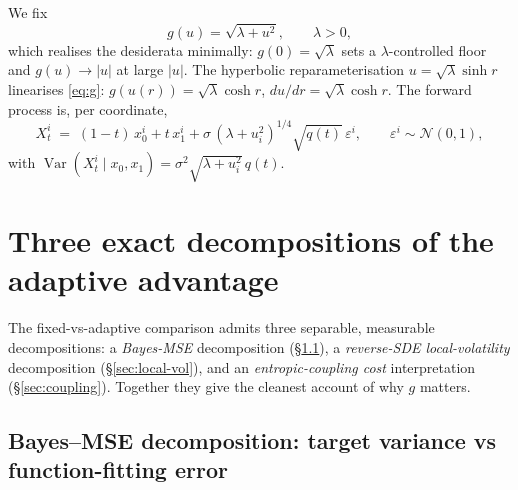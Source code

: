 \documentclass[11pt]{article}
\newcommand{\Var}{\operatorname{Var}}
\newcommand{\N}{\mathcal{N}}
\begin{document}
We fix
\begin{equation}
    g(u) = \sqrt{\lambda + u^2}, \qquad \lambda > 0,
    \label{eq:g}
\end{equation}
which realises the desiderata minimally: $g(0)=\sqrt\lambda$ sets a
$\lambda$-controlled floor and $g(u)\to|u|$ at large $|u|$. The
hyperbolic reparameterisation $u=\sqrt\lambda\sinh r$ linearises
\eqref{eq:g}: $g(u(r))=\sqrt\lambda\cosh r$, $du/dr=\sqrt\lambda\cosh r$.
The forward process is, per coordinate,
\begin{equation}
    X_t^i \;=\; (1-t)\,x_0^i + t\,x_1^i + \sigma\,(\lambda + u_i^2)^{1/4}\sqrt{q(t)}\,\varepsilon^i,
    \qquad \varepsilon^i\sim\N(0,1),
    \label{eq:forward}
\end{equation}
with $\Var(X_t^i \mid x_0,x_1) = \sigma^2 \sqrt{\lambda + u_i^2}\, q(t)$.

\section{Three exact decompositions of the adaptive advantage}
\label{sec:decomp}

The fixed-vs-adaptive comparison admits three separable, measurable
decompositions: a \emph{Bayes-MSE} decomposition (\S\ref{sec:bayes-mse}),
a \emph{reverse-SDE local-volatility} decomposition
(\S\ref{sec:local-vol}), and an \emph{entropic-coupling cost}
interpretation (\S\ref{sec:coupling}). Together they give the cleanest
account of why $g$ matters.

\subsection{Bayes--MSE decomposition: target variance vs function-fitting error}
\label{sec:bayes-mse}
\end{document}
